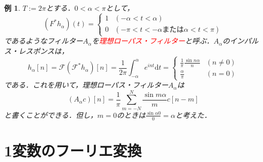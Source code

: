 \documentclass[a4j]{jsbook}
\newtheorem{example}[theorem]{例}
\numberwithin{theorem}{chapter}  %
\begin{document}
\begin{example}  \label{ex2-10}
\(T:=2\pi\)とする．\(0<\alpha<\pi\)として，
\begin{equation*}
    (F^* h_\alpha)(t)=
    \begin{cases}
    1 & (-\alpha<t<\alpha) \\
    0 & (-\pi<t<-\alpha\mbox{または}\alpha<t<\pi)
    \end{cases}
\end{equation*}
であるようなフィルター\(A_\alpha\)を\textcolor{red}{理想ローパス・フィルター}と呼ぶ．\(A_\alpha\)のインパルス・レスポンスは，
\begin{equation*}
    h_\alpha[n]=\mathcal{F}(\mathcal{F}^* h_\alpha)[n]=\frac{1}{2\pi}\int_{-\alpha}^\alpha e^{int}\mathrm{d}t=
    \begin{cases}
    \frac{1}{\pi}\frac{\sin n\alpha}{n} & (n\neq 0) \\
    \frac{\alpha}{\pi} & (n=0)
    \end{cases}
\end{equation*}
である．これを用いて，理想ローパス・フィルター\(A_\alpha\)は
\begin{equation*}
    (A_\alpha c)[n]=\frac{1}{\pi}\sum_{m=-N}^N \frac{\sin m\alpha}{m}c[n-m]
\end{equation*}
と書くことができる．但し，\(m=0\)のときは\(\displaystyle\frac{\sin \alpha 0}{0}=\alpha\)と考えた．
\end{example}
\chapter{1変数のフーリエ変換} \label{chap3}
\end{document}
